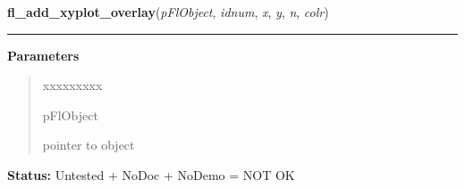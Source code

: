 \hspace{.8\funcindent}\begin{boxedminipage}{\funcwidth}

    \raggedright \textbf{fl\_add\_xyplot\_overlay}(\textit{pFlObject}, \textit{idnum}, \textit{x}, \textit{y}, \textit{n}, \textit{colr})

    \vspace{-1.5ex}

    \rule{\textwidth}{0.5\fboxrule}
\setlength{\parskip}{2ex}
\setlength{\parskip}{1ex}
      \textbf{Parameters}
      \vspace{-1ex}

      \begin{quote}
        \begin{Ventry}{xxxxxxxxx}

          \item[pFlObject]

          pointer to object

        \end{Ventry}

      \end{quote}

\textbf{Status:} Untested + NoDoc + NoDemo = NOT OK



    \end{boxedminipage}

    \label{xformslib:flxyplot:fl_add_xyplot_overlay_file}

    \vspace{0.5ex}

